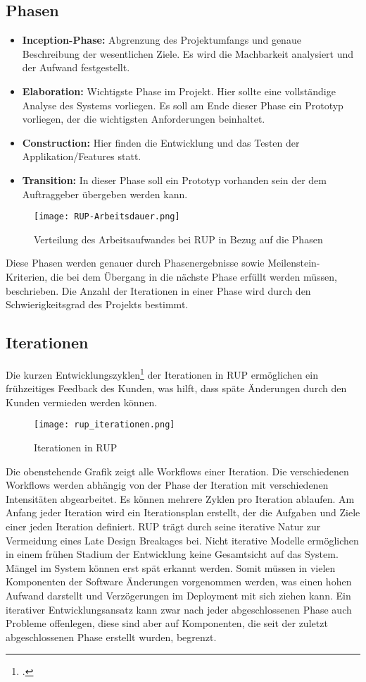 \subsection{Phasen}
\begin{itemize}
	\item \textbf{Inception-Phase:} Abgrenzung des Projektumfangs und genaue Beschreibung der wesentlichen Ziele. Es wird die Machbarkeit analysiert und der Aufwand festgestellt.
	\item \textbf{Elaboration:} Wichtigste Phase im Projekt. Hier sollte eine vollständige Analyse des Systems vorliegen. Es soll am Ende dieser Phase ein Prototyp vorliegen, der die wichtigsten Anforderungen beinhaltet.
	\item \textbf{Construction:} Hier finden die Entwicklung und das Testen der Applikation/Features statt.
	\item \textbf{Transition:} In dieser Phase soll ein Prototyp vorhanden sein der dem Auftraggeber übergeben werden kann. 
\end{itemize}
\begin{center}
\begin{figure}[H]
	\centering
	\texttt{[image: RUP-Arbeitsdauer.png]}
	\caption{Verteilung des Arbeitsaufwandes bei RUP in Bezug auf die Phasen}
\end{figure}
\end{center}
Diese Phasen werden genauer durch Phasenergebnisse sowie Meilenstein-Kriterien, die bei dem Übergang in die nächste Phase erfüllt werden müssen, beschrieben.
Die Anzahl der Iterationen in einer Phase wird durch den Schwierigkeitsgrad des Projekts bestimmt. 
\subsection{Iterationen}
Die kurzen Entwicklungszyklen\footcite{rup-workflows} der Iterationen in RUP ermöglichen ein frühzeitiges Feedback des Kunden, was hilft, dass späte Änderungen durch den Kunden vermieden werden können. 
\begin{center}
\begin{figure}[H]
	\centering
	\texttt{[image: rup\_iterationen.png]}
	\caption{Iterationen in RUP}
\end{figure}
\end{center}
Die obenstehende Grafik zeigt alle Workflows einer Iteration. Die verschiedenen Workflows werden abhängig von der Phase der Iteration mit verschiedenen Intensitäten abgearbeitet. 
Es können mehrere Zyklen pro Iteration ablaufen.
Am Anfang jeder Iteration wird ein Iterationsplan erstellt, der die Aufgaben und Ziele einer jeden Iteration definiert. 
RUP trägt durch seine iterative Natur zur Vermeidung eines Late Design Breakages bei. Nicht iterative Modelle ermöglichen in einem frühen Stadium der Entwicklung keine Gesamtsicht auf das System. Mängel im System können erst spät erkannt werden. Somit müssen in vielen Komponenten der Software Änderungen vorgenommen werden, was einen hohen Aufwand darstellt und Verzögerungen im Deployment mit sich ziehen kann. 
Ein iterativer Entwicklungsansatz kann zwar nach jeder abgeschlossenen Phase auch Probleme offenlegen, diese sind aber auf Komponenten, die seit der zuletzt abgeschlossenen Phase erstellt wurden, begrenzt.
